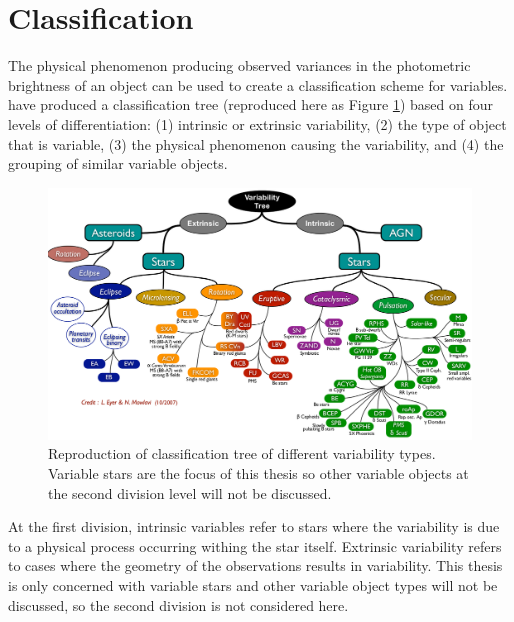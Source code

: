 \section{Classification}

The physical phenomenon producing observed variances in the photometric brightness of an object can be used to create a classification scheme for variables. \citet{eyer_variable_2008} have produced a classification tree (reproduced here as Figure \ref{fig:variability_tree}) based on four levels of differentiation: (1) intrinsic or extrinsic variability, (2) the type of object that is variable, (3) the physical phenomenon causing the variability, and (4) the grouping of similar variable objects.

\begin{figure}[htbp]
    \centering
    \includegraphics[height=0.78\linewidth,angle=-90]{Chapter1/variable_EyerMowlavi08.png}
    \caption[Variability classification tree]{Reproduction of \citet{eyer_variable_2008} classification tree of different variability types. Variable stars are the focus of this thesis so other variable objects at the second division level will not be discussed.}
    \label{fig:variability_tree}
\end{figure}

At the first division, intrinsic variables refer to stars where the variability is due to a physical process occurring withing the star itself. Extrinsic variability refers to cases where the geometry of the observations results in variability. This thesis is only concerned with variable stars and other variable object types will not be discussed, so the second division is not considered here. 

